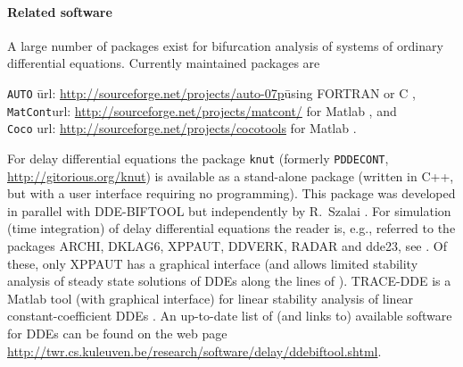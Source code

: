 \documentclass[10pt]{scrartcl}
\newcommand{\DDEBIFCODE}{\textsc{DDE-BIFTOOL}}
\newcommand{\ddebifweb}{\url{http://twr.cs.kuleuven.be/research/software/delay/ddebiftool.shtml}}
\begin{document}
\paragraph{Related software}
A large number of packages exist for bifurcation analysis of systems
of ordinary differential equations. Currently maintained packages are
\begin{tabbing}
  \texttt{AUTO}\qquad
  \= url: \url{http://sourceforge.net/projects/auto-07p}\qquad\=
  using FORTRAN or C \cite{Doed99,Doed07},\\
  \texttt{MatCont}\>url: \url{http://sourceforge.net/projects/matcont/}\>
  for Matlab \cite{DGK03,G00}, and\\
  \texttt{Coco}\> url: \url{http://sourceforge.net/projects/cocotools}\> for
  Matlab \cite{DS13}.
\end{tabbing}
For delay differential equations the package \texttt{knut} (formerly
\texttt{PDDECONT}, \url{http://gitorious.org/knut}) is available as a
stand-alone package (written in C++, but with a user interface
requiring no programming). This package was developed in parallel with
\DDEBIFCODE{} but independently by R.~Szalai \cite{SSH06,RS07}.  For
simulation (time integration) of delay differential equations the
reader is, e.g., referred to the packages ARCHI, DKLAG6, XPPAUT,
DDVERK, RADAR and dde23, see
\cite{Paul95,Thom97,Erme98,Enri97,Sham00,Gugl07}.  Of these, only
XPPAUT has a graphical interface (and allows limited stability
analysis of steady state solutions of DDEs along the lines of
\cite{Luzy96}). TRACE-DDE is a Matlab tool (with graphical interface)
for linear stability analysis of linear constant-coefficient DDEs
\cite{breda09}. An up-to-date list of (and links to) available software
for DDEs can be found on the web page \ddebifweb{}.
\end{document}
